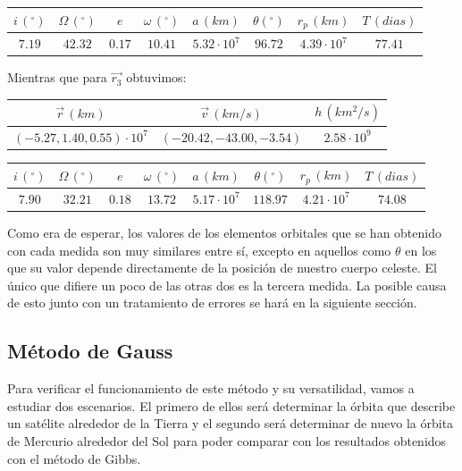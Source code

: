\documentclass{article}
\numberwithin{equation}{section}
\begin{document}
\begin{center}
    \centering
    \begin{tabular}{|c|c|c|c|c|c|c|c|}
    \hline
     $i\, (^{\circ})$ & $\Omega\, (^\circ)$ & $e$ & $\omega\, (^\circ)$ & $a\, (km)$ & $\theta (^\circ)$ & $r_{p}\, (km)$ & $T\, (dias)$\\ \hline
    $7.19$ & $42.32$ & $0.17$ & $10.41$ & $5.32\cdot 10^{7}$ & $96.72$ & $4.39\cdot 10^{7}$ & $77.41$ \\ \hline
    \end{tabular}
\end{center}
Mientras que para $\overrightarrow{r_{3}}$ obtuvimos:

\begin{center}
    \centering
    \begin{tabular}{|c|c|c|}
    \hline
    $\overrightarrow{r}\, (km)$ & $\overrightarrow{v}\, (km/s)$ & $h\, ( km^{2}/s)$  \\ \hline
    $(-5.27,1.40,0.55)\cdot10^7$ & $(-20.42,-43.00,-3.54)$ & $2.58 \cdot 10^{9}$\\ \hline
    \end{tabular}
\end{center}

\begin{center}
    \centering
    \begin{tabular}{|c|c|c|c|c|c|c|c|}
    \hline
     $i\, (^{\circ})$ & $\Omega\, (^\circ)$ & $e$ & $\omega\, (^\circ)$ & $a\, (km)$ & $\theta (^\circ)$ & $r_{p}\, (km)$ & $T\, (dias)$\\ \hline
    $7.90$ & $32.21$ & $0.18$ & $13.72$ & $5.17\cdot 10^{7}$ & $118.97$ & $4.21\cdot 10^{7}$ & $74.08$ \\ \hline
    \end{tabular}
\end{center}
Como era de esperar, los valores de los elementos orbitales 
que se han obtenido con cada medida son muy similares entre sí, excepto 
en aquellos como $\theta$ en los que su valor depende directamente de 
la posición de nuestro cuerpo celeste. 
El único que difiere un poco de las otras dos es la tercera medida. 
La posible causa de esto junto con un tratamiento de errores 
se hará en la siguiente sección.

\subsection{Método de Gauss}

Para verificar el funcionamiento de este método y su versatilidad, vamos a estudiar dos escenarios. El primero de ellos será determinar la órbita que describe un satélite alrededor de la Tierra y el segundo será determinar de nuevo la órbita de Mercurio alrededor del Sol para poder comparar con los resultados obtenidos con el método de Gibbs.\\
\end{document}
